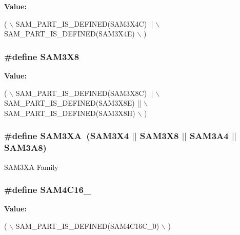 {\bfseries Value\-:}
\begin{DoxyCode}
( \(\backslash\)
                SAM\_PART\_IS\_DEFINED(SAM3X4C) || \(\backslash\)
                SAM\_PART\_IS\_DEFINED(SAM3X4E) \(\backslash\)
                )
\end{DoxyCode}
\hypertarget{group__sam__part__macros__group_ga13be8353e38999aaca5c412c895c15da}{
\subsubsection[{S\-A\-M3\-X8}]{\setlength{\rightskip}{0pt plus 5cm}\#define S\-A\-M3\-X8}}\label{group__sam__part__macros__group_ga13be8353e38999aaca5c412c895c15da}
{\bfseries Value\-:}
\begin{DoxyCode}
( \(\backslash\)
                SAM\_PART\_IS\_DEFINED(SAM3X8C) || \(\backslash\)
                SAM\_PART\_IS\_DEFINED(SAM3X8E) || \(\backslash\)
                SAM\_PART\_IS\_DEFINED(SAM3X8H) \(\backslash\)
                )
\end{DoxyCode}
\hypertarget{group__sam__part__macros__group_gaae4990dfaa4eeed17d8a0351cca02fdd}{
\subsubsection[{S\-A\-M3\-X\-A}]{\setlength{\rightskip}{0pt plus 5cm}\#define S\-A\-M3\-X\-A~(S\-A\-M3\-X4 $|$$|$ S\-A\-M3\-X8 $|$$|$ S\-A\-M3\-A4 $|$$|$ S\-A\-M3\-A8)}}\label{group__sam__part__macros__group_gaae4990dfaa4eeed17d8a0351cca02fdd}
S\-A\-M3\-X\-A Family \hypertarget{group__sam__part__macros__group_ga933b4554835e5159623415812db1400e}{
\subsubsection[{S\-A\-M4\-C16\-\_\-0}]{\setlength{\rightskip}{0pt plus 5cm}\#define S\-A\-M4\-C16\-\_}}\label{group__sam__part__macros__group_ga933b4554835e5159623415812db1400e}
{\bfseries Value\-:}
\begin{DoxyCode}
( \(\backslash\)
                SAM\_PART\_IS\_DEFINED(SAM4C16C\_0) \(\backslash\)
                )
\end{DoxyCode}
